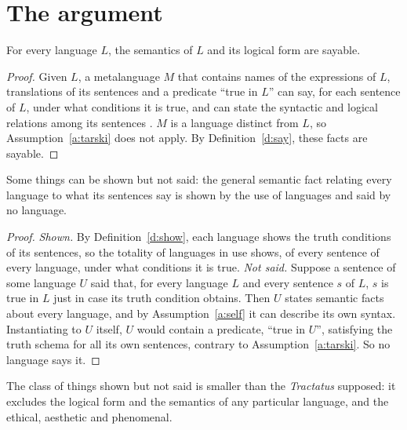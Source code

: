 \documentclass{situationist-preprint}
\begin{document}
\section{The argument}

\begin{lemma}\label{l:particular}
For every language $L$, the semantics of $L$ and its logical form are sayable.
\end{lemma}

\begin{proof}
Given $L$, a metalanguage $M$ that contains names of the expressions of $L$, translations of its sentences and a predicate \enquote{true in $L$} can say, for each sentence of $L$, under what conditions it is true, and can state the syntactic and logical relations among its sentences \citep{Tarski1956,Carnap1937}. $M$ is a language distinct from $L$, so Assumption~\ref{a:tarski} does not apply. By Definition~\ref{d:say}, these facts are sayable.
\end{proof}

\begin{theorem}\label{t:main}
Some things can be shown but not said: the general semantic fact relating every language to what its sentences say is shown by the use of languages and said by no language.
\end{theorem}

\begin{proof}
\emph{Shown.} By Definition~\ref{d:show}, each language shows the truth conditions of its sentences, so the totality of languages in use shows, of every sentence of every language, under what conditions it is true. \emph{Not said.} Suppose a sentence of some language $U$ said that, for every language $L$ and every sentence $s$ of $L$, $s$ is true in $L$ just in case its truth condition obtains. Then $U$ states semantic facts about every language, and by Assumption~\ref{a:self} it can describe its own syntax. Instantiating to $U$ itself, $U$ would contain a predicate, \enquote{true in $U$}, satisfying the truth schema for all its own sentences, contrary to Assumption~\ref{a:tarski}. So no language says it.
\end{proof}

\begin{corollary}\label{c:smaller}
The class of things shown but not said is smaller than the \emph{Tractatus} supposed: it excludes the logical form and the semantics of any particular language, and the ethical, aesthetic and phenomenal.
\end{corollary}
\end{document}
